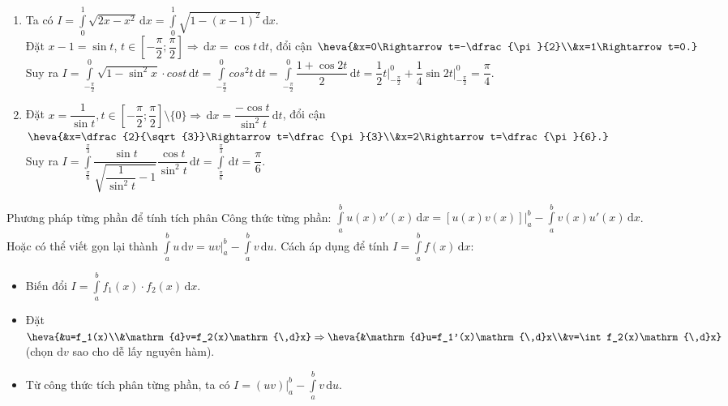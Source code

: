 \begin{ex}
{\begin{enumerate}
			\item Ta có $I=\displaystyle\int\limits_0^1\sqrt{2x-x^2}\mathrm{\,d}x=\displaystyle\int\limits_0^1\sqrt{1-(x-1)^2}\mathrm{\,d}x$.\\
			Đặt $x-1=\sin t$, $t\in\left[-\dfrac{\pi}{2};\dfrac{\pi}{2}\right]\Rightarrow\mathrm{\,d}x=\cos t\mathrm{\,d}t$, đổi cận $\heva{&x=0\Rightarrow t=-\dfrac{\pi}{2}\\&x=1\Rightarrow t=0.}$\\
			Suy ra $I=\displaystyle\int\limits_{-\tfrac{\pi}{2}}^0\sqrt{1-\sin^2x}\cdot cost\mathrm{\,d}t=\displaystyle\int\limits_{-\tfrac{\pi}{2}}^0 cos^2t\mathrm{\,d}t=\displaystyle\int\limits_{-\tfrac{\pi}{2}}^0\dfrac{1+\cos 2t}{2}\mathrm{\,d}t=\dfrac{1}{2}t\bigg|_{-\tfrac{\pi}{2}}^0+\dfrac{1}{4}\sin 2t\bigg|_{-\tfrac{\pi}{2}}^0=\dfrac{\pi}{4}$.
			\item Đặt $x=\dfrac{1}{\sin t}, t\in\left[-\dfrac{\pi}{2};\dfrac{\pi}{2}\right]\setminus\{0\}\Rightarrow\mathrm{\,d}x=\dfrac{-\cos t}{\sin^2t}\mathrm{\,d}t$, đổi cận $\heva{&x=\dfrac{2}{\sqrt{3}}\Rightarrow t=\dfrac{\pi}{3}\\&x=2\Rightarrow t=\dfrac{\pi}{6}.}$\\
			Suy ra $I=\displaystyle\int\limits_{\tfrac{\pi}{6}}^{\tfrac{\pi}{3}}\dfrac{\sin t}{\sqrt{\dfrac{1}{\sin^2t}-1}}\dfrac{\cos t}{\sin^2t}\mathrm{\,d}t=\displaystyle\int\limits_{\tfrac{\pi}{6}}^{\tfrac{\pi}{3}}\mathrm{\,d}t=\dfrac{\pi}{6}$.
		\end{enumerate}
	}
\end{ex}
\begin{dang}{Phương pháp từng phần để tính tích phân}
	Công thức từng phần: $\displaystyle\int\limits_a^b u(x)v'(x)\mathrm{\,d}x=\left.[u(x)v(x)]\right|_a^b-\int\limits_a^b v(x)u'(x)\mathrm{\,d}x$.\\
	Hoặc có thể viết gọn lại thành $\displaystyle\int\limits_a^b u\mathrm{\,d}v=\left.uv\right|_a^b-\int\limits_a^b v\mathrm{\,d}u$. Cách áp dụng để tính $I=\displaystyle\int\limits_a^b f(x)\mathrm{\,d}x$:
	\begin{itemize}
		\item Biến đổi $I=\displaystyle\int\limits_a^b f_1(x)\cdot f_2(x)\mathrm{\,d}x$.
		\item Đặt $\displaystyle\heva{&u=f_1(x)\\&\mathrm{d}v=f_2(x)\mathrm{\,d}x}\Rightarrow\heva{&\mathrm{d}u=f_1'(x)\mathrm{\,d}x\\&v=\int f_2(x)\mathrm{\,d}x}$ (chọn $\mathrm{d}v$ sao cho dễ lấy nguyên hàm).
		\item Từ công thức tích phân từng phần, ta có $\displaystyle I=\left.(uv)\right|_a^b-\int\limits_a^b v\mathrm{\,d}u$.
	\end{itemize}
\end{dang}
